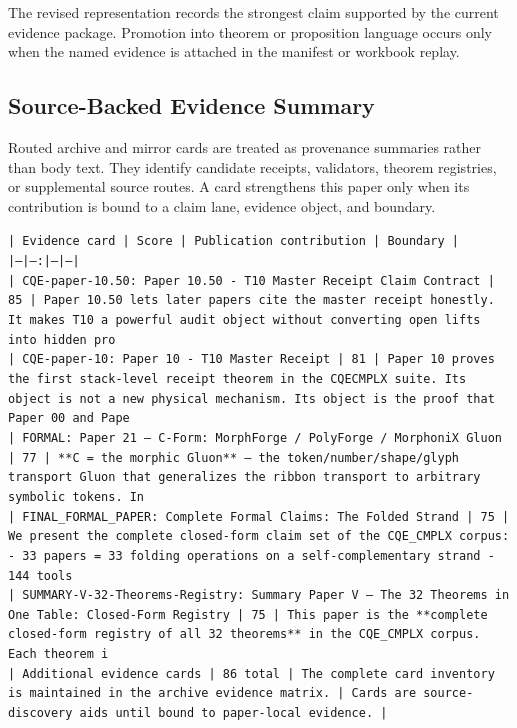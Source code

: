 \documentclass[11pt]{article}
\begin{document}
The revised representation records the strongest claim supported by the current evidence package. Promotion into theorem or proposition language occurs only when the named evidence is attached in the manifest or workbook replay.

\subsection*{Source-Backed Evidence Summary}

Routed archive and mirror cards are treated as provenance summaries rather than
body text. They identify candidate receipts, validators, theorem registries, or
supplemental source routes. A card strengthens this paper only when its
contribution is bound to a claim lane, evidence object, and boundary.

\noindent\texttt{| Evidence card | Score | Publication contribution | Boundary |}\\
\noindent\texttt{|---|---:|---|---|}\\
\noindent\texttt{| CQE-paper-10.50: Paper 10.50 - T10 Master Receipt Claim Contract | 85 | Paper 10.50 lets later papers cite the master receipt honestly. It makes T10 a powerful audit object without converting open lifts into hidden pro}\\
\noindent\texttt{| CQE-paper-10: Paper 10 - T10 Master Receipt | 81 | Paper 10 proves the first stack-level receipt theorem in the CQECMPLX suite. Its object is not a new physical mechanism. Its object is the proof that Paper 00 and Pape}\\
\noindent\texttt{| FORMAL: Paper 21 — C-Form: MorphForge / PolyForge / MorphoniX Gluon | 77 | **C = the morphic Gluon** — the token/number/shape/glyph transport Gluon that generalizes the ribbon transport to arbitrary symbolic tokens. In}\\
\noindent\texttt{| FINAL\_FORMAL\_PAPER: Complete Formal Claims: The Folded Strand | 75 | We present the complete closed-form claim set of the CQE\_CMPLX corpus: - 33 papers = 33 folding operations on a self-complementary strand - 144 tools}\\
\noindent\texttt{| SUMMARY-V-32-Theorems-Registry: Summary Paper V — The 32 Theorems in One Table: Closed-Form Registry | 75 | This paper is the **complete closed-form registry of all 32 theorems** in the CQE\_CMPLX corpus. Each theorem i}\\
\noindent\texttt{| Additional evidence cards | 86 total | The complete card inventory is maintained in the archive evidence matrix. | Cards are source-discovery aids until bound to paper-local evidence. |}\\
\end{document}
